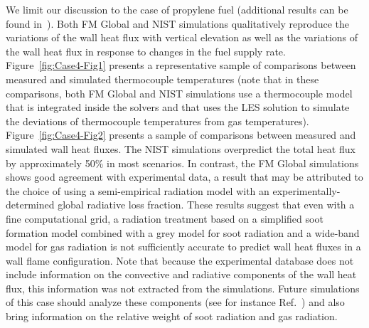 We limit our discussion to the case of propylene fuel (additional results can be found in~\cite{MaCFP_wks_presentations}). Both FM Global and NIST simulations qualitatively reproduce the variations of the wall heat flux with vertical elevation as well as the variations of the wall heat flux in response to changes in the fuel supply rate. Figure~\ref{fig:Case4-Fig1} presents a representative sample of comparisons between measured and simulated thermocouple temperatures (note that in these comparisons, both FM Global and NIST simulations use a thermocouple model that is integrated inside the solvers and that uses the LES solution to simulate the deviations of thermocouple temperatures from gas temperatures). Figure~\ref{fig:Case4-Fig2} presents a sample of comparisons between measured and simulated wall heat fluxes. The NIST simulations overpredict the total heat flux by approximately 50\% in most scenarios. In contrast, the FM Global simulations shows good agreement with experimental data, a result that may be attributed to the choice of using a semi-empirical radiation model with an experimentally-determined global radiative loss fraction. These results suggest that even with a fine computational grid, a radiation treatment based on a simplified soot formation model combined with a grey model for soot radiation and a wide-band model for gas radiation is not sufficiently accurate to predict wall heat fluxes in a wall flame configuration. Note that because the experimental database does not include information on the convective and radiative components of the wall heat flux, this information was not extracted from the simulations. Future simulations of this case should analyze these components (see for instance Ref.~\cite{Ren:2016}) and also bring information on the relative weight of soot radiation and gas radiation.

